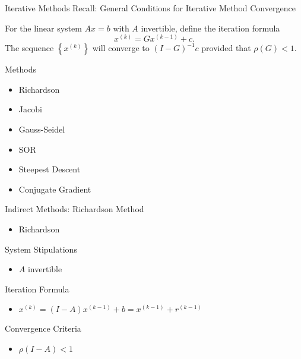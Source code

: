 \documentclass[9pt, serif]{beamer}
\newlength{\wideitemsep}
\let\olditem\item
\renewcommand{\item}{\setlength{\itemsep}{\wideitemsep}\olditem}
\newcommand{\bi}{\begin{itemize}}
\newcommand{\ei}{\end{itemize}}
\begin{document}
\begin{frame}{Iterative Methods}
    \pause
    Recall: General Conditions for Iterative Method Convergence \pause
        \begin{theorem}
        For the linear system $Ax = b$ with $A$ invertible, define the iteration formula $$x^{(k)} = Gx^{(k-1)} + c.$$
        The sequence $\left\{x^{(k)}\right\}$ will converge to $(I - G)^{-1}c$ provided that $\rho(G) < 1$.
    \end{theorem}
    \pause
    Methods
    \bi
        \item Richardson
        \item Jacobi
        \item Gauss-Seidel
        \item SOR
        \item Steepest Descent
        \item Conjugate Gradient
    \ei
\end{frame}


\begin{frame}{Indirect Methods: Richardson}
    Method
    \bi
        \item Richardson
    \ei
    System Stipulations
    \bi
        \item $A$ invertible
    \ei
    Iteration Formula
    \bi
        \item $x^{(k)} = (I-A)x^{(k-1)}+b = x^{(k-1)}+r^{(k-1)}$
    \ei
    Convergence Criteria
    \bi
        \item $\rho(I-A)<1$
    \ei
\end{frame}
\end{document}
